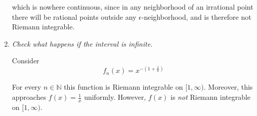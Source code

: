 \documentclass[11pt]{article}
\newcommand{\N}{\mathbb{N}}
\begin{document}
\begin{enumerate}
which is nowhere continuous, since in any neighborhood of an irrational point there will be rational points outside any $\epsilon$-neighborhood, and is therefore not Riemann integrable.

\item \emph{Check what happens if the interval is infinite.}

Consider
\[
f_n(x) = x^{-\left(1+\frac{1}{n}\right)}
\]

For every $n \in \N$ this function is Riemann integrable on $[1,\infty)$.  Moreover, this approaches $f(x) = \frac{1}{x}$ uniformly.  However, $f(x)$ is \emph{not} Riemann integrable on $[1,\infty)$.

\end{enumerate}
\end{document}

